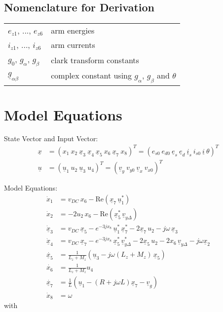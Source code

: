 \documentclass[10pt,a4paper]{article}
\begin{document}

	\subsection{Nomenclature for Derivation}
	
	\begin{tabular}{ll}
		$e_{z1}$, ..., $e_{z6}$ & arm energies\\
		$i_{z1}$, ..., $i_{z6}$ & arm currents \\
		$g_0$, $g_\alpha$, $g_\beta$ & clark transform constants \\
		$\underline{g}_{\alpha\beta}$ & complex constant using $g_\alpha$, $g_\beta$ and $\theta$ 
	\end{tabular}

		
	\section{Model Equations}
	
	State Vector and Input Vector:	
	\begin{align*}
		\underline{x} &= (x_1 \ x_2 \ \underline{x}_3 \ \underline{x}_4 \ \underline{x}_5 \ x_6 \ \underline{x}_7 \ x_8)^T = (e_{s0} \ e_{d0} \ \underline{e}_s \ \underline{e}_d \ \underline{i}_s \ i_{s0} \ \underline{i} \ \theta)^T \\
		\underline{u} &= (\underline{u}_1 \ u_2 \ \underline{u}_3 \ u_4)^T = (\underline{v}_y \ v_{y0} \ \underline{v}_x \ v_{x0})^T
	\end{align*}
	
	\noindent Model Equations:	
	\begin{subequations}	
	\begin{align}
		\dot{x}_1 &= v_{DC} \, x_6 - \mathrm{Re} (\underline{x}_7\, \underline{u}_1^*)				\\
		\dot{x}_2 &=-2 u_2\, x_6 - \mathrm{Re} (\underline{x}_5^* \, \underline{v}_{y\Delta})		\\
		\dot{\underline{x}}_3 &=v_{DC}\, \underline{x}_5 - e^{-3j x_8}\, \underline{u}_1^* \, \underline{x}_7^* - 2 \underline{x}_7\, u_2 - j\omega \, \underline{x}_3 		\\
		\dot{\underline{x}}_4 &= v_{DC}\, \underline{x}_7 - e^{-3j x_8}\, \underline{x}_5^* \, \underline{v}_{y\Delta}^* - 2 \underline{x}_5 \, u_2 - 2 x_6\, \underline{v}_{y\Delta} - j\omega \underline{x}_2		 \\
		\dot{\underline{x}_5} &= \frac{1}{L_z+M_z} (\underline{u}_3 - j\omega (L_z+M_z)\, \underline{x}_5 )		\\
		\dot{x_6} &= \frac{1}{L_z+M_z} u_4		\\
		\dot{\underline{x}_7} &= \frac{1}{L} ( \underline{u}_1 - (R+j\omega L)\underline{x}_7 - \underline{v}_g)	\\
		\dot{x}_8 &= \omega
	\end{align}
	\end{subequations}
	with
	
\end{document}
